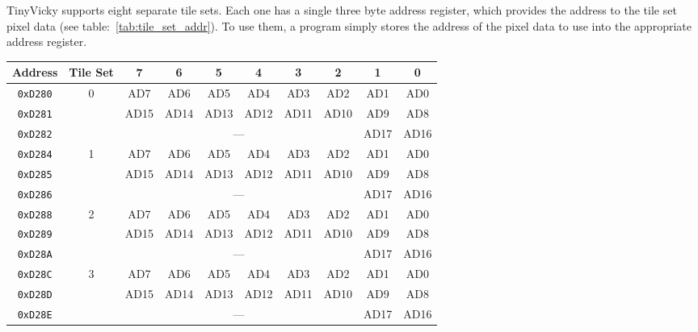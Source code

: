 TinyVicky supports eight separate tile sets. Each one has a single three byte address register, which provides the address to the tile set pixel data (see table:~\ref{tab:tile_set_addr}). To use them, a program simply stores the address of the pixel data to use into the appropriate address register.

\begin{table}[h]
    \begin{center}
        \begin{tabular}{|c|c|c|c|c|c|c|c|c|c|} \hline
            Address & Tile Set & 7 & 6 & 5 & 4 & 3 & 2 & 1 & 0 \\ \hline\hline
            \verb+0xD280+ & \multirow{3}{*}{0} & AD7 & AD6 & AD5 & AD4 & AD3 & AD2 & AD1 & AD0 \\ \cline{1-1}\cline{3-10}
            \verb+0xD281+ &                    & AD15 & AD14 & AD13 & AD12 & AD11 & AD10 & AD9 & AD8 \\ \cline{1-1}\cline{3-10}
            \verb+0xD282+ &                    & \multicolumn{6}{|c|}{---} & AD17 & AD16 \\ \hline\hline

            \verb+0xD284+ & \multirow{3}{*}{1} & AD7 & AD6 & AD5 & AD4 & AD3 & AD2 & AD1 & AD0 \\ \cline{1-1}\cline{3-10}
            \verb+0xD285+ &                    & AD15 & AD14 & AD13 & AD12 & AD11 & AD10 & AD9 & AD8 \\ \cline{1-1}\cline{3-10}
            \verb+0xD286+ &                    & \multicolumn{6}{|c|}{---} & AD17 & AD16 \\ \hline\hline

            \verb+0xD288+ & \multirow{3}{*}{2} & AD7 & AD6 & AD5 & AD4 & AD3 & AD2 & AD1 & AD0 \\ \cline{1-1}\cline{3-10}
            \verb+0xD289+ &                    & AD15 & AD14 & AD13 & AD12 & AD11 & AD10 & AD9 & AD8 \\ \cline{1-1}\cline{3-10}
            \verb+0xD28A+ &                    & \multicolumn{6}{|c|}{---} & AD17 & AD16 \\ \hline\hline

            \verb+0xD28C+ & \multirow{3}{*}{3} & AD7 & AD6 & AD5 & AD4 & AD3 & AD2 & AD1 & AD0 \\ \cline{1-1}\cline{3-10}
            \verb+0xD28D+ &                    & AD15 & AD14 & AD13 & AD12 & AD11 & AD10 & AD9 & AD8 \\ \cline{1-1}\cline{3-10}
            \verb+0xD28E+ &                    & \multicolumn{6}{|c|}{---} & AD17 & AD16 \\ \hline\hline


\end{tabular}
\end{center}
\end{table}
